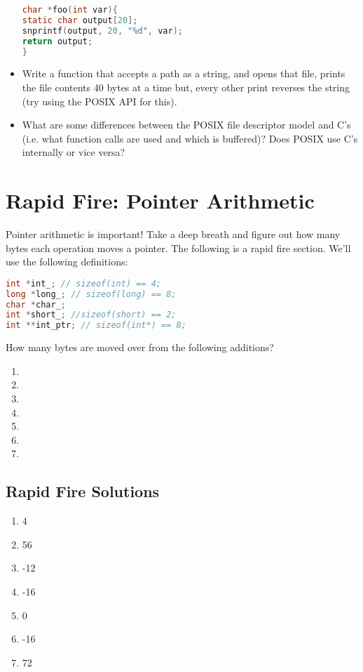 \begin{itemize}
	      \begin{lstlisting}[language=C]
char *foo(int var){
static char output[20];
snprintf(output, 20, "%d", var);
return output;
}
\end{lstlisting}
	\item
	      Write a function that accepts a path as a string, and opens that file, prints the file contents 40 bytes at a time but, every other print reverses the string (try using the POSIX API for this).
	\item
	      What are some differences between the POSIX file descriptor model and C's  (i.e. what function calls are used and which is buffered)? Does POSIX use C's  internally or vice versa?
\end{itemize}

\section{Rapid Fire: Pointer Arithmetic}

Pointer arithmetic is important!
Take a deep breath and figure out how many bytes each operation moves a pointer.
The following is a rapid fire section.
We'll use the following definitions:

\begin{lstlisting}[language=C]
int *int_; // sizeof(int) == 4;
long *long_; // sizeof(long) == 8;
char *char_;
int *short_; //sizeof(short) == 2;
int **int_ptr; // sizeof(int*) == 8;
\end{lstlisting}

How many bytes are moved over from the following additions?

\begin{enumerate}
\item {}
\item {}
\item {}
\item {}
\item {}
\item {}
\item {}
\end{enumerate}

\subsection{Rapid Fire Solutions}

\begin{enumerate}
\item 4
\item 56
\item -12
\item -16
\item 0
\item -16
\item 72
\end{enumerate}



